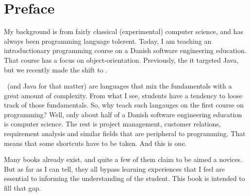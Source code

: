\chapter*{Preface}

My background is from fairly classical (experimental) computer science, and has always been programming language tolerent. Today, I am teaching an introductionary programming course on a Danish software engineering education. That course has a focus on object-orientation. Previously, the it targeted Java, but we recently made the shift to \csharp.

\csharp\ (and Java for that matter) are languages that mix the fundamentals with a great amount of complexity. From what I see, students have a tendency to loose track of those fundamentals. So, why teach such langauges on the first course on programming? Well, only about half of a Danish software engineering education is computer science. The rest is project management, customer relations, requirement analysis and similar fields that are peripheral to programming. That means that some shortcuts have to be taken. And this is one.

Many \csharp books already exist, and quite a few of them claim to be aimed a novices. But as far as I can tell, they all bypass learning experiences that I feel are essential to informing the understanding of the student. This book is intended to fill that gap.
